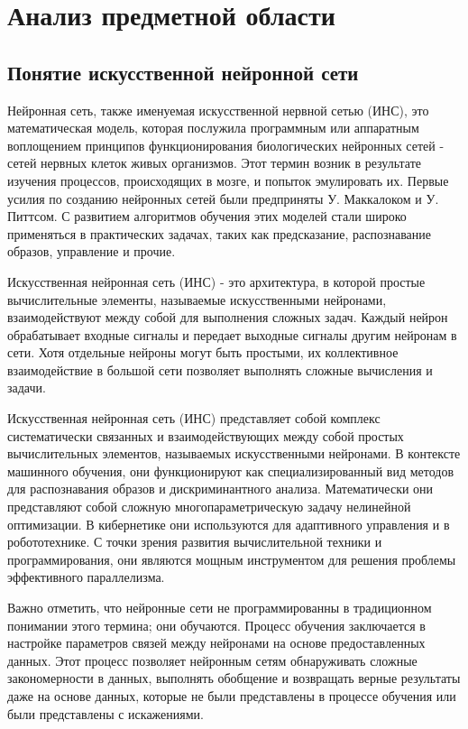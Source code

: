 \section{Анализ предметной области}
\subsection{Понятие искусственной нейронной сети}
Нейронная сеть, также именуемая искусственной нервной сетью (ИНС), это математическая модель, которая послужила программным или аппаратным воплощением принципов функционирования биологических нейронных сетей - сетей нервных клеток живых организмов. Этот термин возник в результате изучения процессов, происходящих в мозге, и попыток эмулировать их. Первые усилия по созданию нейронных сетей были предприняты У. Маккалоком и У. Питтсом. С развитием алгоритмов обучения этих моделей стали широко применяться в практических задачах, таких как предсказание, распознавание образов, управление и прочие.

Искусственная нейронная сеть (ИНС) - это архитектура, в которой простые вычислительные элементы, называемые искусственными нейронами, взаимодействуют между собой для выполнения сложных задач. Каждый нейрон обрабатывает входные сигналы и передает выходные сигналы другим нейронам в сети. Хотя отдельные нейроны могут быть простыми, их коллективное взаимодействие в большой сети позволяет выполнять сложные вычисления и задачи.

Искусственная нейронная сеть (ИНС) представляет собой комплекс систематически связанных и взаимодействующих между собой простых вычислительных элементов, называемых искусственными нейронами. В контексте машинного обучения, они функционируют как специализированный вид методов для распознавания образов и дискриминантного анализа. Математически они представляют собой сложную многопараметрическую задачу нелинейной оптимизации. В кибернетике они используются для адаптивного управления и в робототехнике. С точки зрения развития вычислительной техники и программирования, они являются мощным инструментом для решения проблемы эффективного параллелизма.

Важно отметить, что нейронные сети не программированны в традиционном понимании этого термина; они обучаются. Процесс обучения заключается в настройке параметров связей между нейронами на основе предоставленных данных. Этот процесс позволяет нейронным сетям обнаруживать сложные закономерности в данных, выполнять обобщение и возвращать верные результаты даже на основе данных, которые не были представлены в процессе обучения или были представлены с искажениями.

